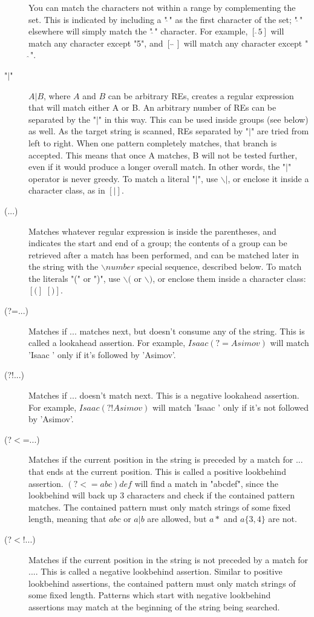 \begin{description}
    You can match the characters not within a range by complementing the set. This is indicated by including a "$\hat{~}$" as the first character of the set; "$\hat{~}$" elsewhere will simply match the "$\hat{~}$" character. For example, $[\hat{~}5]$ will match any character except "5", and $[\hat{~}\hat{~}]$ will match any character except "$\hat{~}$". 
    \item ["$\vert$"]
    $A|B$, where $A$ and $B$ can be arbitrary REs, creates a regular expression that will match either A or B. An arbitrary number of REs can be separated by the "$\vert$" in this way. This can be used inside groups (see below) as well. As the target string is scanned, REs separated by "$\vert$" are tried from left to right. When one pattern completely matches, that branch is accepted. This means that once A matches, B will not be tested further, even if it would produce a longer overall match. In other words, the "$|$" operator is never greedy. To match a literal "$|$", use $\backslash|$, or enclose it inside a character class, as in $[|]$.
    \item [(...)]
    Matches whatever regular expression is inside the parentheses, and indicates the start and end of a group; the contents of a group can be retrieved after a match has been performed, and can be matched later in the string with the $\backslash number$ special sequence, described below. To match the literals "(" or ")", use $\backslash($ or $\backslash)$, or enclose them inside a character class: $[(]$ $[)]$.
    \item [(?=...)]
    Matches if ... matches next, but doesn't consume any of the string. This is called a lookahead assertion. For example, $Isaac (?=Asimov)$ will match 'Isaac ' only if it's followed by 'Asimov'.
    \item [(?!...)]
    Matches if ... doesn't match next. This is a negative lookahead assertion. For example, $Isaac (?!Asimov)$ will match 'Isaac ' only if it's not followed by 'Asimov'.
    \item [(?$<$=...)]
    Matches if the current position in the string is preceded by a match for ... that ends at the current position. This is called a positive lookbehind assertion. $(?<=abc)def$ will find a match in "abcdef", since the lookbehind will back up 3 characters and check if the contained pattern matches. The contained pattern must only match strings of some fixed length, meaning that $abc$ or $a|b$ are allowed, but $a*$ and $a\{3,4\}$ are not.
    \item [(?$<$!...)]
    Matches if the current position in the string is not preceded by a match for .... This is called a negative lookbehind assertion. Similar to positive lookbehind assertions, the contained pattern must only match strings of some fixed length. Patterns which start with negative lookbehind assertions may match at the beginning of the string being searched.

\end{description}
